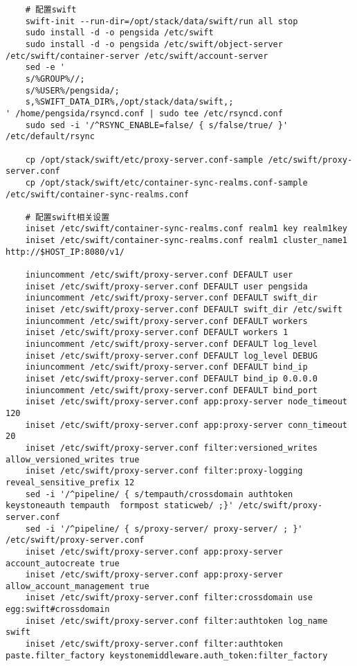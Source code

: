 \documentclass[a4paper,left=1.5cm,right=1.5cm,11pt]{article}
\begin{document}
\begin{lstlisting}
	# 配置swift
	swift-init --run-dir=/opt/stack/data/swift/run all stop
	sudo install -d -o pengsida /etc/swift
    sudo install -d -o pengsida /etc/swift/object-server /etc/swift/container-server /etc/swift/account-server
	sed -e '
	s/%GROUP%//;
	s/%USER%/pengsida/;
	s,%SWIFT_DATA_DIR%,/opt/stack/data/swift,;
' /home/pengsida/rsyncd.conf | sudo tee /etc/rsyncd.conf
	sudo sed -i '/^RSYNC_ENABLE=false/ { s/false/true/ }' /etc/default/rsync

	cp /opt/stack/swift/etc/proxy-server.conf-sample /etc/swift/proxy-server.conf
	cp /opt/stack/swift/etc/container-sync-realms.conf-sample /etc/swift/container-sync-realms.conf
	
    # 配置swift相关设置
	iniset /etc/swift/container-sync-realms.conf realm1 key realm1key
    iniset /etc/swift/container-sync-realms.conf realm1 cluster_name1 http://$HOST_IP:8080/v1/

    iniuncomment /etc/swift/proxy-server.conf DEFAULT user
    iniset /etc/swift/proxy-server.conf DEFAULT user pengsida
    iniuncomment /etc/swift/proxy-server.conf DEFAULT swift_dir
    iniset /etc/swift/proxy-server.conf DEFAULT swift_dir /etc/swift
    iniuncomment /etc/swift/proxy-server.conf DEFAULT workers
    iniset /etc/swift/proxy-server.conf DEFAULT workers 1
    iniuncomment /etc/swift/proxy-server.conf DEFAULT log_level
    iniset /etc/swift/proxy-server.conf DEFAULT log_level DEBUG
    iniuncomment /etc/swift/proxy-server.conf DEFAULT bind_ip
    iniset /etc/swift/proxy-server.conf DEFAULT bind_ip 0.0.0.0
    iniuncomment /etc/swift/proxy-server.conf DEFAULT bind_port
	iniset /etc/swift/proxy-server.conf app:proxy-server node_timeout 120
    iniset /etc/swift/proxy-server.conf app:proxy-server conn_timeout 20
    iniset /etc/swift/proxy-server.conf filter:versioned_writes allow_versioned_writes true
	iniset /etc/swift/proxy-server.conf filter:proxy-logging reveal_sensitive_prefix 12
	sed -i '/^pipeline/ { s/tempauth/crossdomain authtoken keystoneauth tempauth  formpost staticweb/ ;}' /etc/swift/proxy-server.conf
	sed -i '/^pipeline/ { s/proxy-server/ proxy-server/ ; }' /etc/swift/proxy-server.conf
    iniset /etc/swift/proxy-server.conf app:proxy-server account_autocreate true
    iniset /etc/swift/proxy-server.conf app:proxy-server allow_account_management true
    iniset /etc/swift/proxy-server.conf filter:crossdomain use egg:swift#crossdomain
    iniset /etc/swift/proxy-server.conf filter:authtoken log_name swift
    iniset /etc/swift/proxy-server.conf filter:authtoken paste.filter_factory keystonemiddleware.auth_token:filter_factory


\end{lstlisting}
\end{document}
